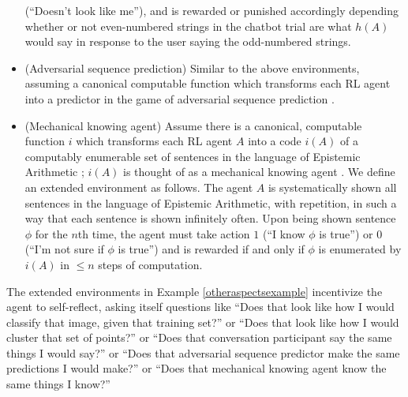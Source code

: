 \documentclass[runningheads]{llncs}
\begin{document}
\begin{example}
\begin{itemize}
        (``Doesn't look like me''), and is rewarded or punished accordingly depending
        whether or not even-numbered strings in the chatbot trial are what $h(A)$ would
        say in response to the user saying the odd-numbered strings.
        \item
        (Adversarial sequence prediction) Similar to the above environments, assuming
        a canonical computable function which transforms each RL agent into a predictor
        in the game of adversarial sequence prediction \cite{hibbard2008adversarial}
        \cite{hibbard}.
        \item
        (Mechanical knowing agent) Assume there is a canonical, computable function
        $i$ which transforms each RL agent $A$ into a code $i(A)$ of a computably
        enumerable set of sentences in the language of Epistemic Arithmetic
        \cite{shapiro}; $i(A)$ is thought of as a mechanical knowing agent
        \cite{carlson}. We define an extended environment as follows. The agent $A$
        is systematically shown all sentences in the language of Epistemic Arithmetic,
        with repetition, in such a way that each sentence is shown infinitely often.
        Upon being shown sentence $\phi$ for the $n$th time, the agent must take action
        $1$ (``I know $\phi$ is true'')
        or $0$ (``I'm not sure if $\phi$ is true'')
        and is rewarded if and only if $\phi$ is
        enumerated by $i(A)$ in $\leq n$ steps of computation.
    \end{itemize}
\end{example}

The extended environments in Example \ref{otheraspectsexample} incentivize the agent
to self-reflect, asking itself questions like ``Does that look like how I would
classify that image, given that training set?'' or ``Does that look like how I would
cluster that set of points?'' or ``Does that conversation participant say the same things
I would say?'' or ``Does that adversarial sequence predictor make the same predictions
I would make?'' or ``Does that mechanical knowing agent know the same things I know?''



\end{document}
